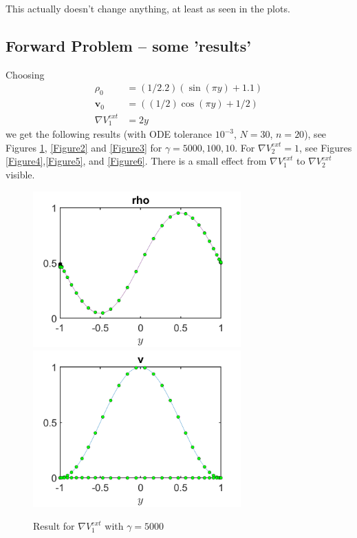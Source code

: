 \documentclass[11pt, a4paper]{article}
\theoremstyle{definition}
\newcommand{\Stav}{\mathbf{v}}
\begin{document}
This actually doesn't change anything, at least as seen in the plots.

\subsection{Forward Problem -- some 'results'}

Choosing 
\begin{align*}
\rho_0 &= (1/2.2)(\sin(\pi y) + 1.1)\\
\Stav_0 &= ((1/2)\cos(\pi y) + 1/2)\\
\nabla V^{ext}_1 &= 2 y
\end{align*}
we get the following results (with ODE tolerance $10^{-3}$, $N=30$, $n=20$), see Figures \ref{Figure1}, \ref{Figure2} and \ref{Figure3} for $\gamma = 5000, 100, 10$. For $\nabla V^{ext}_2 = 1$, see Figures \ref{Figure4},\ref{Figure5}, and \ref{Figure6}. There is a small effect from $\nabla V^{ext}_1$ to $\nabla V^{ext}_2$ visible.
\begin{figure}
	\includegraphics[width=8cm]{rho1.png}
	\includegraphics[width=8cm]{v1.png}
	\caption{Result for $\nabla V^{ext}_1 $ with $\gamma =5000$}
	\label{Figure1}
\end{figure}
\end{document}
